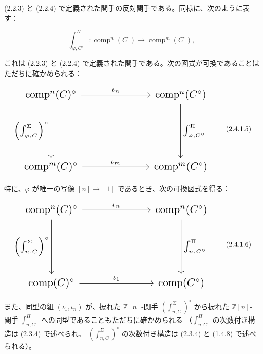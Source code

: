 \clearpage
{}%
(2.2.3) と (2.2.4) で定義された関手の反対関手である。同様に、次のように表す：

\begin{equation}
  \int_{\varphi,C^\circ}^{\Pi}\colon
  \operatorname{comp}^{n}(C^\circ)
  \longrightarrow
  \operatorname{comp}^{m}(C^\circ),
  \tag{2.4.1.4}
\end{equation}

これは (2.2.3) と (2.2.4) で定義された関手である。次の図式が可換であることは
ただちに確かめられる：

\begin{equation}
  \resizebox{0.82\textwidth}{!}{%
    $\begin{tikzcd}[ampersand replacement=\&,column sep=6.5em,row sep=5.2em]
      \operatorname{comp}^{n}(C)^\circ
        \arrow[r,"\iota_n"]
        \arrow[d,"{\left(\int_{\varphi,C}^{\Sigma}\right)^\circ}"']
        \& \operatorname{comp}^{n}(C^\circ)
          \arrow[d,"{\int_{\varphi,C^\circ}^{\Pi}}"] \\
      \operatorname{comp}^{m}(C)^\circ
        \arrow[r,"\iota_m"]
        \& \operatorname{comp}^{m}(C^\circ)
    \end{tikzcd}$%
  }
  \tag{2.4.1.5}
\end{equation}

特に、$\varphi$ が唯一の写像
$[n]\longrightarrow[1]$ であるとき、次の可換図式を得る：

\begin{equation}
  \resizebox{0.82\textwidth}{!}{%
    $\begin{tikzcd}[ampersand replacement=\&,column sep=6.5em,row sep=5.2em]
      \operatorname{comp}^{n}(C)^\circ
        \arrow[r,"\iota_n"]
        \arrow[d,"{\left(\int_{n,C}^{\Sigma}\right)^\circ}"']
        \& \operatorname{comp}^{n}(C^\circ)
          \arrow[d,"{\int_{n,C^\circ}^{\Pi}}"] \\
      \operatorname{comp}(C)^\circ
        \arrow[r,"\iota_1"]
        \& \operatorname{comp}(C^\circ)
    \end{tikzcd}$%
  }
  \tag{2.4.1.6}
\end{equation}

また、同型の組 $(\iota_1,\iota_n)$ が、捩れた
$\mathbb Z[n]$-関手 $\left(\int_{n,C}^{\Sigma}\right)^\circ$ から捩れた
$\mathbb Z[n]$-関手 $\int_{n,C^\circ}^{\Pi}$ への同型であることもただちに確かめられる
（$\int_{n,C^\circ}^{\Pi}$ の次数付き構造は (2.3.4) で述べられ、
$\left(\int_{n,C}^{\Sigma}\right)^\circ$ の次数付き構造は (2.3.4) と
(1.4.8) で述べられる）。

